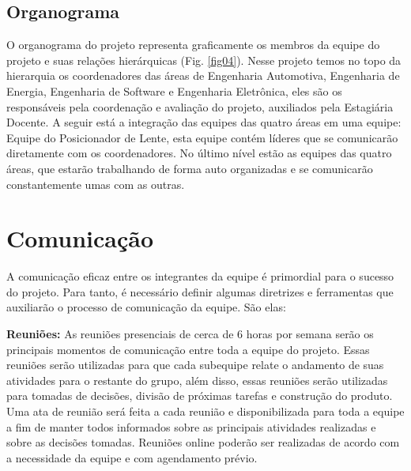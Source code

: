 \subsection[Organograma]{Organograma}

O organograma do projeto representa graficamente os membros da equipe do projeto e suas relações hierárquicas (Fig. \ref{fig04}). Nesse projeto temos no topo da hierarquia os coordenadores das áreas de Engenharia Automotiva, Engenharia de Energia, Engenharia de Software e Engenharia Eletrônica, eles são os responsáveis pela coordenação e avaliação do projeto, auxiliados pela Estagiária Docente. A seguir está a integração das equipes das quatro áreas em uma equipe: Equipe do Posicionador de Lente, esta equipe contém líderes que se comunicarão diretamente com os coordenadores. No último nível estão as equipes das quatro áreas, que estarão trabalhando de forma auto organizadas e se comunicarão constantemente umas com as outras. 

\section[Comunicação]{Comunicação}

A comunicação eficaz entre os integrantes da equipe é primordial para o sucesso do projeto. Para tanto, é necessário definir algumas diretrizes e ferramentas que auxiliarão o processo de comunicação da equipe. São elas:

\textbf{Reuniões:}
As reuniões presenciais de cerca de 6 horas por semana serão os principais momentos de comunicação entre toda a equipe do projeto. Essas reuniões serão utilizadas para que cada subequipe relate o andamento de suas atividades para o restante do grupo, além disso, essas reuniões serão utilizadas para tomadas de decisões, divisão de próximas tarefas e construção do produto. Uma ata de reunião será feita a cada reunião e disponibilizada para toda a equipe a fim de manter todos informados sobre as principais atividades realizadas e sobre as decisões tomadas. Reuniões online poderão ser realizadas de acordo com a necessidade da equipe e com agendamento prévio. 

